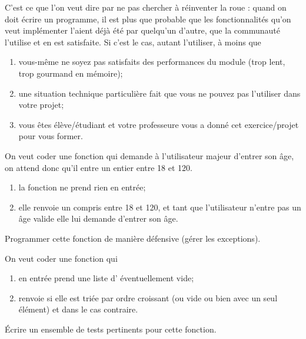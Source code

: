 \documentclass[a4paper,12pt,french]{book}
\begin{document}
C'est ce que l'on veut dire par \og ne pas chercher à réinventer la roue\fg{} : quand on doit écrire un programme, il est plus que probable que les fonctionnalités qu'on veut implémenter l'aient déjà été par quelqu'un d'autre, que la communauté l'utilise et en est satisfaite. Si c'est le cas, autant l'utiliser, à moins que
\begin{enumerate}[--]
	\item 	vous-même ne soyez pas satisfaits des performances du module (trop lent, trop gourmand en mémoire);
	\item 	une situation technique particulière fait que vous ne pouvez pas l'utiliser dans votre projet;
	\item 	vous êtes élève/étudiant et votre professeur\cdot e	vous a donné cet exercice/projet pour vous former.
\end{enumerate}
\exostart
\begin{exercice}
	On veut coder une fonction  qui demande à l'utilisateur majeur d'entrer son âge, on attend donc qu'il entre un entier entre 18 et 120.
	\begin{enumerate}[--]
		\item 	la fonction ne prend rien en entrée;
		\item 	elle renvoie un  compris entre 18 et 120, et tant que l'utilisateur n'entre pas un âge valide elle lui demande d'entrer son âge.
	\end{enumerate}
	Programmer cette fonction de manière défensive (gérer les exceptions).
\end{exercice}

\begin{exercice}[]
	On veut coder une fonction  qui 
	\begin{enumerate}[--]
		\item 	en entrée prend une liste d' éventuellement vide;
		\item 	renvoie  si elle est triée par ordre croissant (ou vide ou bien avec un seul élément) et  dans le cas contraire.	
	\end{enumerate}
	\'Ecrire un ensemble de tests pertinents pour cette fonction.
\end{exercice}
\end{document}
